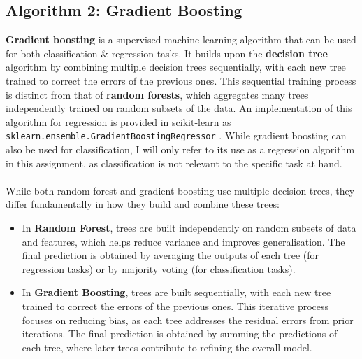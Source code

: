 \documentclass[a4paper, 10pt]{article}
\begin{document}
\subsection{Algorithm 2: Gradient Boosting}
\textbf{Gradient boosting} is a supervised machine learning algorithm that can be used for both classification \& regression tasks. 
It builds upon the \textbf{decision tree} algorithm by combining multiple decision trees sequentially, with each new tree trained to correct the errors of the previous ones. 
This sequential training process is distinct from that of \textbf{random forests}, which aggregates many trees independently trained on random subsets of the data.
An implementation of this algorithm for regression is provided in scikit-learn as \texttt{sklearn.ensemble.GradientBoostingRegressor} \supercite{scikit_gradientboostingregressor}. 
While gradient boosting can also be used for classification, I will only refer to its use as a regression algorithm in this assignment, as classification is not relevant to the specific task at hand.
\\\\
While both random forest and gradient boosting use multiple decision trees, they differ fundamentally in how they build and combine these trees:
\begin{itemize}
    \item   In \textbf{Random Forest}, trees are built independently on random subsets of data and features, which helps reduce variance and improves generalisation. 
    The final prediction is obtained by averaging the outputs of each tree (for regression tasks) or by majority voting (for classification tasks).

    \item   In \textbf{Gradient Boosting}, trees are built sequentially, with each new tree trained to correct the errors of the previous ones. 
    This iterative process focuses on reducing bias, as each tree addresses the residual errors from prior iterations.
    The final prediction is obtained by summing the predictions of each tree, where later trees contribute to refining the overall model.
\end{itemize}
\end{document}
